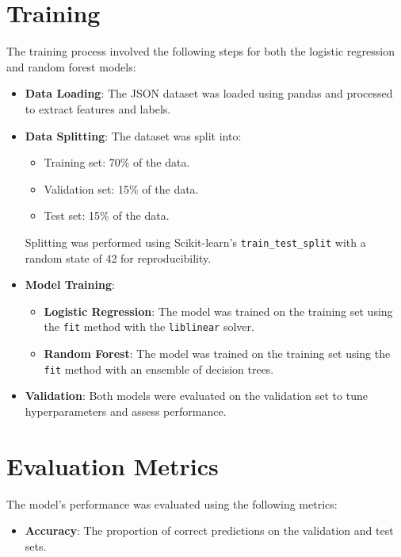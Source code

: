 \documentclass[12pt, a4paper]{article}
\begin{document}
\section{Training}
The training process involved the following steps for both the logistic regression and random forest models:

\begin{itemize}
    \item \textbf{Data Loading}: The JSON dataset was loaded using pandas and processed to extract features and labels.
    \item \textbf{Data Splitting}: The dataset was split into:
        \begin{itemize}
            \item Training set: 70\% of the data.
            \item Validation set: 15\% of the data.
            \item Test set: 15\% of the data.
        \end{itemize}
        Splitting was performed using Scikit-learn's \texttt{train\_test\_split} with a random state of 42 for reproducibility.
    \item \textbf{Model Training}:
        \begin{itemize}
            \item \textbf{Logistic Regression}: The model was trained on the training set using the \texttt{fit} method with the \texttt{liblinear} solver.
            \item \textbf{Random Forest}: The model was trained on the training set using the \texttt{fit} method with an ensemble of decision trees.
        \end{itemize}
    \item \textbf{Validation}: Both models were evaluated on the validation set to tune hyperparameters and assess performance.
\end{itemize}

\section{Evaluation Metrics}
The model’s performance was evaluated using the following metrics:

\begin{itemize}
    \item \textbf{Accuracy}: The proportion of correct predictions on the validation and test sets.
\end{itemize}
\end{document}
